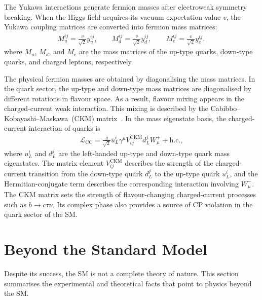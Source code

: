 The Yukawa interactions generate fermion masses after electroweak symmetry breaking. 
When the Higgs field acquires its vacuum expectation value $v$, the Yukawa coupling matrices are converted into fermion mass matrices:
\begin{align*}
    M_{u}^{ij}
    =
    \frac{v}{\sqrt{2}}y_{u}^{ij},
    \qquad
    M_{d}^{ij}
    =
    \frac{v}{\sqrt{2}}y_{d}^{ij},
    \qquad
    M_{e}^{ij}
    =
    \frac{v}{\sqrt{2}}y_{e}^{ij},
\end{align*}
where $M_{u}$, $M_{d}$, and $M_{e}$ are the mass matrices of the up-type quarks, down-type quarks, and charged leptons, respectively. 

The physical fermion masses are obtained by diagonalising the mass matrices. 
In the quark sector, the up-type and down-type mass matrices are diagonalised by different rotations in flavour space. 
As a result, flavour mixing appears in the charged-current weak interaction. 
This mixing is described by the Cabibbo--Kobayashi--Maskawa~(CKM) matrix~\cite{Cabibbo1963,KobayashiMaskawa1973}. 
In the mass eigenstate basis, the charged-current interaction of quarks is
\begin{align*}
    \mathcal{L}_{\mathrm{CC}}
    =
    \frac{g}{\sqrt{2}}
    \bar{u}_{L}^{i}
    \gamma^{\mu}
    V_{ij}^{\mathrm{CKM}}
    d_{L}^{j}
    W_{\mu}^{+}
    +
    \mathrm{h.c.},
\end{align*}
where $u_{L}^{i}$ and $d_{L}^{j}$ are the left-handed up-type and down-type quark mass eigenstates. 
The matrix element $V_{ij}^{\mathrm{CKM}}$ describes the strength of the charged-current transition from the down-type quark $d_{L}^{j}$ to the up-type quark $u_{L}^{i}$, and the Hermitian-conjugate term describes the corresponding interaction involving $W_{\mu}^{-}$. 
The CKM matrix sets the strength of flavour-changing charged-current processes such as $b\rightarrow c\tau\nu$. 
Its complex phase also provides a source of CP violation in the quark sector of the SM.


\section{Beyond the Standard Model}
\label{sec:bsm}

Despite its success, the SM is not a complete theory of nature. 
This section summarises the experimental and theoretical facts that point to physics beyond the SM.


